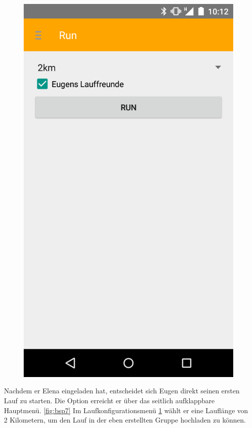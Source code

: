 \begin{figure}[!h]
\begin{minipage}{.4\textwidth}
  \includegraphics[width=.8\linewidth]{abb/bsp/bsp8}
  \label{fig:bsp8}
\end{minipage}
\end{figure}

Nachdem er Elena eingeladen hat, entscheidet sich Eugen direkt seinen ersten Lauf zu starten. Die Option erreicht er über das seitlich aufklappbare Hauptmenü. \ref{fig:bsp7} Im Laufkonfigurationsmenü \ref{fig:bsp8} wählt er eine Lauflänge von  2 Kilometern, um den Lauf in der eben erstellten Gruppe hochladen zu können.

